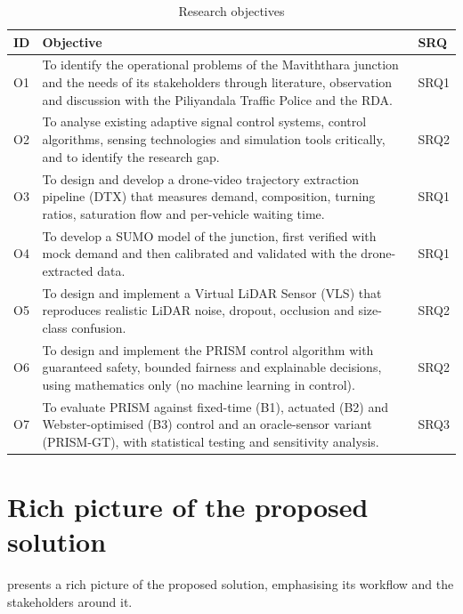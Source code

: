 \begin{table}[htbp]
  \centering
  \caption{Research objectives}
  \label{tab:intro-objectives}
  \small
  \renewcommand{\arraystretch}{1.15}
  \begin{tabularx}{\textwidth}{@{}l X l@{}}
    \toprule
    \textbf{ID} & \textbf{Objective} & \textbf{SRQ} \\
    \midrule
    O1 & To identify the operational problems of the Maviththara junction and the needs of its stakeholders through literature, observation and discussion with the Piliyandala Traffic Police and the RDA. & SRQ1 \\
    O2 & To analyse existing adaptive signal control systems, control algorithms, sensing technologies and simulation tools critically, and to identify the research gap. & SRQ2 \\
    O3 & To design and develop a drone-video trajectory extraction pipeline (DTX) that measures demand, composition, turning ratios, saturation flow and per-vehicle waiting time. & SRQ1 \\
    O4 & To develop a SUMO model of the junction, first verified with mock demand and then calibrated and validated with the drone-extracted data. & SRQ1 \\
    O5 & To design and implement a Virtual LiDAR Sensor (VLS) that reproduces realistic LiDAR noise, dropout, occlusion and size-class confusion. & SRQ2 \\
    O6 & To design and implement the PRISM control algorithm with guaranteed safety, bounded fairness and explainable decisions, using mathematics only (no machine learning in control). & SRQ2 \\
    O7 & To evaluate PRISM against fixed-time (B1), actuated (B2) and Webster-optimised (B3) control and an oracle-sensor variant (PRISM-GT), with statistical testing and sensitivity analysis. & SRQ3 \\
    \bottomrule
  \end{tabularx}
\end{table}

\section{Rich picture of the proposed solution}\label{sec:intro-richpicture}

 presents a rich picture of the proposed solution, emphasising its workflow and the stakeholders around it.

